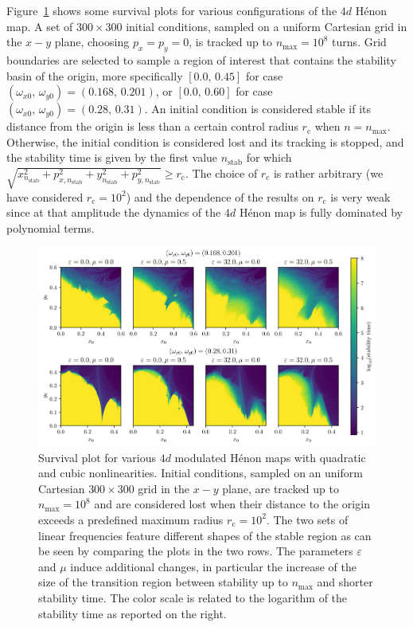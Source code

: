 Figure~\ref{fig:survival} shows some survival plots for various configurations of the $4d$ Hénon map. A set of $300\times300$ initial conditions, sampled on a uniform Cartesian grid in the $x-y$ plane, choosing $p_x = p_y = 0$, is tracked up to $n_\mathrm{max}=10^8$ turns. Grid boundaries are selected to sample a region of interest that contains the stability basin of the origin, more specifically $[0.0,\,0.45]$ for case $(\omega_{x0},\,\omega_{y0}) = (0.168,\,0.201)$, or $[0.0,\,0.60]$ for case $(\omega_{x0},\,\omega_{y0}) = (0.28,\,0.31)$. An initial condition is considered stable if its distance from the origin is less than a certain control radius $r_\mathrm{c}$ when $n=n_\mathrm{max}$. Otherwise, the initial condition is considered lost and its tracking is stopped, and the stability time is given by the first value $n_\mathrm{stab}$ for which $\sqrt{x^2_{n_\mathrm{stab}}+ p_{x,n_\mathrm{stab}}^2+y_{n_\mathrm{stab}}^2+p_{y,n_\mathrm{stab}}^2}\geq r_\mathrm{c}$. The choice of $r_\mathrm{c}$ is rather arbitrary (we have considered $r_\mathrm{c}=10^2$) and the dependence of the results on $r_\mathrm{c}$ is very weak since at that amplitude the dynamics of the $4d$ Hénon map is fully dominated by polynomial terms. 
%
\begin{figure}[htp]
    \centering
    \includegraphics[width=\textwidth]{6_dynamic_indicators/fig/stability.png}
    \caption{Survival plot for various $4d$ modulated Hénon maps with quadratic and cubic nonlinearities. Initial conditions, sampled on an uniform Cartesian $300\times300$ grid in the $x-y$ plane, are tracked up to $n_\text{max}=10^8$ and are considered lost when their distance to the origin exceeds a predefined maximum radius $r_\mathrm{c}=10^2$. The two sets of linear frequencies feature different shapes of the stable region as can be seen by comparing the plots in the two rows. The parameters $\varepsilon$ and $\mu$ induce additional changes, in particular the increase of the size of the transition region between stability up to $n_\mathrm{max}$ and shorter stability time. The color scale is related to the logarithm of the stability time as reported on the right.}
    \label{fig:survival}
\end{figure}
